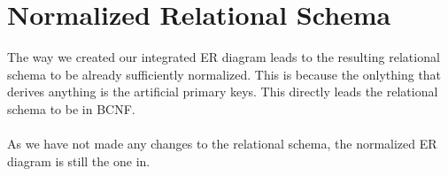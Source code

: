 \section{Normalized Relational Schema}

The way we created our integrated ER diagram leads to the resulting relational schema to be already sufficiently normalized. This is because the onlything that derives anything is the artificial primary keys. This directly leads the relational schema to be in BCNF.\\\\
As we have not made any changes to the relational schema, the normalized ER diagram is still the one in.